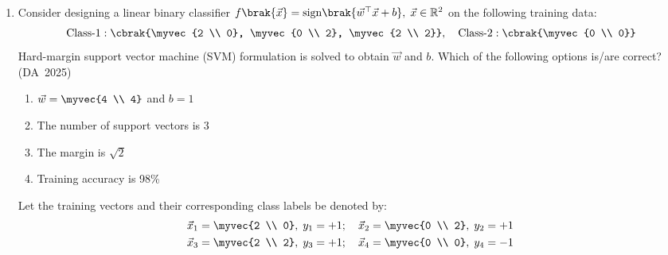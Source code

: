 \begin{enumerate}[label=\thesubsection.\arabic*, ref=\thesubsection.\theenumi]
However, a real orthogonal matrix need not equal $\vec{I}$ and can possess complex eigenvalues of unit modulus $\abs{\lambda} = 1$. For example, the $90^\circ$ rotation matrix:
\begin{align}
	\vec{A} = \myvec{0 & -1 \\ 1 & 0}
\end{align}
satisfies $\vec{A}^\top\vec{A} = \vec{I} \text{ with } \vec{A} \neq \vec{I}$, and its characteristic equation $\lambda^2 + 1 = 0$ yields complex eigenvalues $\lambda = \pm \j \notin \{+1, -1\}$.
\\
The following code verifies the solution
\begin{lstlisting}[frame=single, basicstyle=\rmfamily, escapeinside={(*@}{@*)}]
(*@\makebox[\dimexpr\linewidth-2\fboxsep-2\fboxrule\relax][c]{codes/q33/q33.py}@*)
\end{lstlisting}

\item 
Consider designing a linear binary classifier $f\brak{\vec{x}} = \text{sign}\brak{\vec{w}^{\top}\vec{x} + b}, \; \vec{x} \in \mathbb{R}^2$ on the following training data:
\begin{align}
	\text{Class-1}: \cbrak{\myvec{2 \\ 0}, \myvec{0 \\ 2}, \myvec{2 \\ 2}}, \quad \text{Class-2}: \cbrak{\myvec{0 \\ 0}}
\end{align}
Hard-margin support vector machine (SVM) formulation is solved to obtain $\vec{w}$ and $b$. Which of the following options is/are correct?
\hfill (DA~2025)
\begin{enumerate}
	\item $\vec{w} = \myvec{4 \\ 4}$ and $b = 1$
	\item The number of support vectors is 3
	\item The margin is $\sqrt{2}$
	\item Training accuracy is 98\%
\end{enumerate}
\solution
Let the training vectors and their corresponding class labels be denoted by:
\begin{align}
	\vec{x}_1 &= \myvec{2 \\ 0}, \; y_1 = +1; \quad
	\vec{x}_2 = \myvec{0 \\ 2}, \; y_2 = +1
	\\
	\vec{x}_3 &= \myvec{2 \\ 2}, \; y_3 = +1; \quad
	\vec{x}_4 = \myvec{0 \\ 0}, \; y_4 = -1
\end{align}


\end{enumerate}
